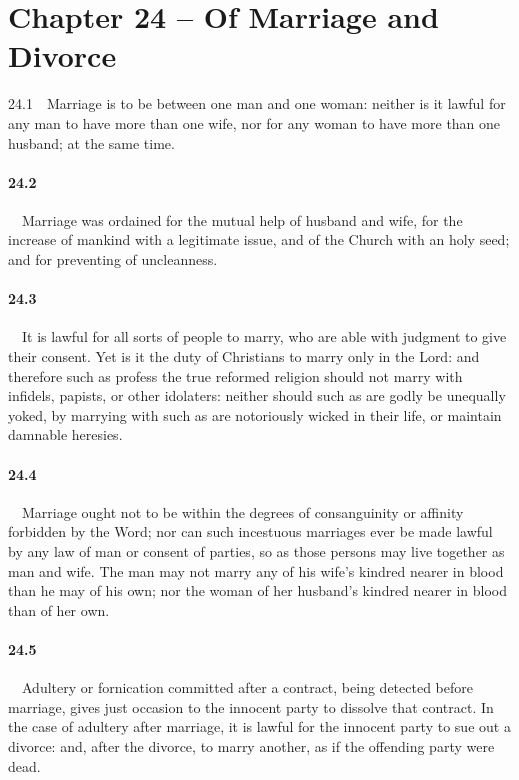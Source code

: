 \section{Chapter 24 -- Of Marriage and Divorce} 24.1\ \ Marriage is to be between one man and one woman: neither is it lawful for any man to have more than one wife, nor for any woman to have more than one husband; at the same time.   
\bigskip
\paragraph{24.2}\ \ Marriage was ordained for the mutual help of husband and wife, for the increase of mankind with a legitimate issue, and of the Church with an holy seed; and for preventing of uncleanness.   
\bigskip
\paragraph{24.3}\ \ It is lawful for all sorts of people to marry, who are able with judgment to give their consent. Yet is it the duty of Christians to marry only in the Lord: and therefore such as profess the true reformed religion should not marry with infidels, papists, or other idolaters: neither should such as are godly be unequally yoked, by marrying with such as are notoriously wicked in their life, or maintain damnable heresies.    
\bigskip
\paragraph{24.4}\ \ Marriage ought not to be within the degrees of consanguinity or affinity forbidden by the Word; nor can such incestuous marriages ever be made lawful by any law of man or consent of parties, so as those persons may live together as man and wife. The man may not marry any of his wife's kindred nearer in blood than he may of his own; nor the woman of her husband's kindred nearer in blood than of her own.   
\bigskip
\paragraph{24.5}\ \ Adultery or fornication committed after a contract, being detected before marriage, gives just occasion to the innocent party to dissolve that contract. In the case of adultery after marriage, it is lawful for the innocent party to sue out a divorce: and, after the divorce, to marry another, as if the offending party were dead.   
\bigskip

